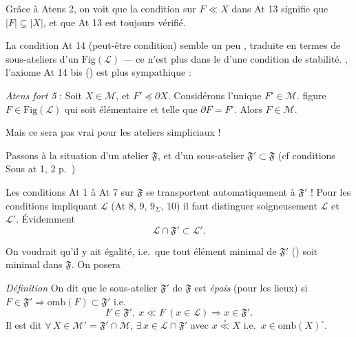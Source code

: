 \documentclass[11pt,a4paper]{article}
\begin{document}

Grâce à Atens 2, on voit que  la condition sur $F \ll X$ dans At 13 signifie que $|F| \subsetneq |X|$, et \struck{\ill{}} que At 13 est toujours vérifié.

La condition At 14 (peut-être \struck{\ill{}} condition) semble  un peu , traduite en termes de sous-ateliers d'un $\mathrm{Fig}(\mathcal{L})$ --- ce n'est plus dans le \ill{} d'une condition de stabilité. \ill{}, l'axiome At 14 bis () est plus sympathique :

\emph{Atens fort 5} : Soit $X \in \mathcal{M}$, et $F' \preccurlyeq \partial X$. Considérons l'unique $F' \in \mathcal{M}$. figure $F \in \mathrm{Fig}(\mathcal{L})$ qui soit élémentaire \struck{---} et telle que $\partial F = F'$. Alors $F \in \mathcal{M}$.

Mais ce sera pas vrai pour les ateliers simpliciaux !


Passons à la situation d'un atelier $\mathfrak{F}$, et d'un sous-atelier $\mathfrak{F}' \subset \mathfrak{F}$ (cf conditions Sous at 1, 2 p.~)

Les conditions At 1 à At 7 sur \struck{\ill{}} $\mathfrak{F}$ se transportent automatiquement à $\mathfrak{F}'$ ! Pour les conditions impliquant $\mathcal{L}$ (At 8, 9, $9_{\Sigma}$, 10) il faut distinguer soigneusement $\mathcal{L}$ et $\mathcal{L}'$. Évidemment
\[
  \mathcal{L} \cap \mathfrak{F}' \subset \mathcal{L}' .
\]

On voudrait qu'il y ait égalité, i.e.\ que tout élément minimal de $\mathfrak{F}'$  \struck{\ill{}} (\ill{}) soit minimal dans $\mathfrak{F}$. On posera

\emph{Définition} On dit que le sous-atelier $\mathfrak{F}'$ de $\mathfrak{F}$ est \emph{épais} (pour les lieux) si $F \in \mathfrak{F}' \Rightarrow \mathrm{omb}(F) \subset \mathfrak{F}'$ i.e.\
\[
  F \in \mathfrak{F}',\ x \ll F \ (x \in \mathcal{L}) \Longrightarrow x \in \mathfrak{F}' .
\]
Il est dit \struck{\ill{}}  $\forall\, X \in \mathcal{M}' = \mathfrak{F}' \cap \mathcal{M}$, $\exists\, x \in \mathcal{L} \cap \mathfrak{F}'$ avec $x \mathrel{\overset{\circ}{\ll}} X$ i.e.\ $x \in \mathrm{omb}(X)^{\circ}$.
\end{document}
